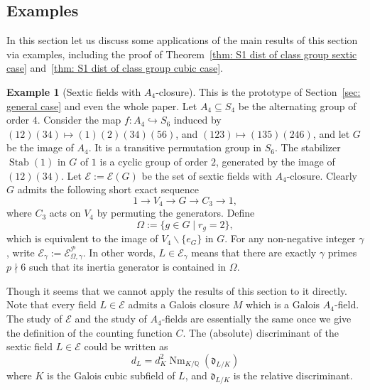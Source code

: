 \documentclass{amsart}
\numberwithin{equation}{section}
\theoremstyle{plain}
\theoremstyle{definition}
\newtheorem{example}[theorem]{Example}
\theoremstyle{remark}
\begin{document}
\subsection{Examples}
In this section let us discuss some applications of the main results of this section via examples, including the proof of Theorem~\ref{thm: S1 dist of class group sextic case} and~\ref{thm: S1 dist of class group cubic case}.
\begin{example}[Sextic fields with $A_4$-closure]
	This is the prototype of Section~\ref{sec: general case} and even the whole paper.
	Let $A_4\subseteq S_4$ be the alternating group of order $4$.
	Consider the map $f:A_4\hookrightarrow S_6$ induced by $(12)(34)\mapsto(1)(2)(34)(56)$, and $(123)\mapsto(135)(246)$, and let $G$ be the image of $A_4$.
	It is a transitive permutation group in $S_6$.
	The stabilizer $\operatorname{Stab}(1)$ in $G$ of $1$ is a cyclic group of order $2$, generated by the image of $(12)(34)$.
	Let $\mathcal{E}:=\mathcal{E}(G)$ be the set of sextic fields with $A_4$-closure.
	Clearly $G$ admits the following short exact sequence
	\begin{equation*}
		1\to V_4\to G\to C_3\to1,
	\end{equation*}
	where $C_3$ acts on $V_4$ by permuting the generators.
	Define
        \begin{equation*}
            \Omega:=\{g\in G\mid r_g=2\},
        \end{equation*}
    which is equivalent to the image of $V_4\backslash\{e_G\}$ in $G$.
	For any non-negative integer $\gamma$, write $\mathcal{E}_{\gamma}:=\mathcal{E}_{\Omega,\gamma}^{\mathcal{P}}$.
	In other words, $L\in\mathcal{E}_{\gamma}$ means that there are exactly $\gamma$ primes $p\nmid6$ such that its inertia generator is contained in $\Omega$.
	
	Though it seems that we cannot apply the results of this section to it directly.
	Note that every field $L\in\mathcal{E}$ admits a Galois closure $M$ which is a Galois $A_4$-field.
    The study of $\mathcal{E}$ and the study of $A_4$-fields are essentially the same once we give the definition of the counting function $C$.
	The (absolute) discriminant of the sextic field $L\in\mathcal{E}$ could be written as
	\begin{equation*}
		d_L=d_K^2\operatorname{Nm}_{K/\mathbb{Q}}(\mathfrak{d}_{L/K})
	\end{equation*}
	where $K$ is the Galois cubic subfield of $L$, and $\mathfrak{d}_{L/K}$ is the relative discriminant.
        

\end{example}
\end{document}
